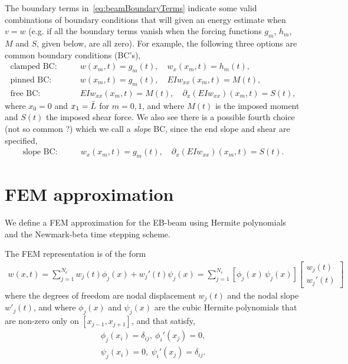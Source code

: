 \documentclass[11pt]{article}
\begin{document}
The boundary terms in~\eqref{eq:beamBoundaryTerms} indicate some valid combinations of boundary conditions that will given an energy estimate
when $v=w$ (e.g. if all the boundary terms vanish when the forcing functions $g_m$, $h_m$, $M$ and $S$, given below, are all zero). 
For example, the following three options are common boundary conditions (BC's), 
\begin{align}
   \text{clamped BC:}\quad & \quad w(x_m,t)=g_m(t),\quad  w_x(x_m,t)=h_m(t),  \\
   \text{pinned BC:} \quad & \quad w(x_m,t)=g_m(t), \quad E I w_{xx}(x_m,t)=M(t), \\
   \text{free BC:}   \quad & \quad  E I w_{xx}(x_m,t)=M(t), \quad \partial_x( E I w_{xx})(x_m,t)=S(t),
\end{align}
where $x_0=0$ and $x_1=\bar{L}$ for $m=0,1$, and 
where $M(t)$ is the imposed moment and $S(t)$ the imposed shear force. 
We also see there is a possible fourth choice (not so common ?) which we call a {\em slope} BC, since
the end slope and shear are specified, 
\begin{align}
   \text{slope BC:}\quad & \quad w_x(x_m,t)=g_m(t),\quad  \partial_x( E I w_{xx})(x_m,t)=S(t). 
\end{align}


\newcommand{\Ne}{N_e}
\section{FEM approximation}\label{sec:BeamModelFEM}

We define a FEM approximation for the EB-beam using Hermite polynomials and the Newmark-beta time stepping scheme.

The FEM representation is of the form
\begin{align}
  w(x,t) = \sum_{j=1}^{\Ne} w_j(t) \phi_j(x) + w_j'(t) \psi_j(x)  = \sum_{j=1}^{\Ne} [ \phi_j(x)\, \psi_j(x)] \begin{bmatrix} w_j(t)\\w_j'(t)\end{bmatrix}
\end{align}
where the degrees of freedom are nodal displacement $w_j(t)$ and the nodal slope $w'_j(t)$, and where $\phi_j(x)$ and $\psi_j(x)$ are 
the cubic Hermite polynomials 
that are non-zero only on $[x_{j-1},x_{j+1}]$,  and
that satisfy,
\begin{align}
  \phi_j(x_i)=\delta_{ij}, ~ \phi_i'(x_j)=0, \\
  \psi_j(x_i)=0, ~ \psi_i'(x_j)=\delta_{ij}.
\end{align}





%
%
\end{document}
